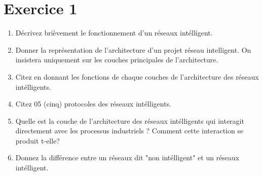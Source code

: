 \section*{Exercice 1 \MarksTwo}

\begin{enumerate}
      \item Décrivez brièvement le fonctionnement d'un réseaux intélligent.
      \item Donner la représentation de l’architecture d’un projet réseau intelligent.
            On insistera uniquement sur les couches principales de l'architecture.
      \item Citez en donnant les fonctions de chaque couches de l'architecture des réseaux intélligents.
      \item Citez 05 (cinq) protocoles des réseaux intélligents.
      \item Quelle est la couche de l'architecture des réseaux intélligents qui interagit directement avec les processus industriels ?
            Comment cette interaction se produit t-elle?
      \item Donnez la différence entre un réseaux dit "non intélligent" et un réseaux intélligent.
\end{enumerate}